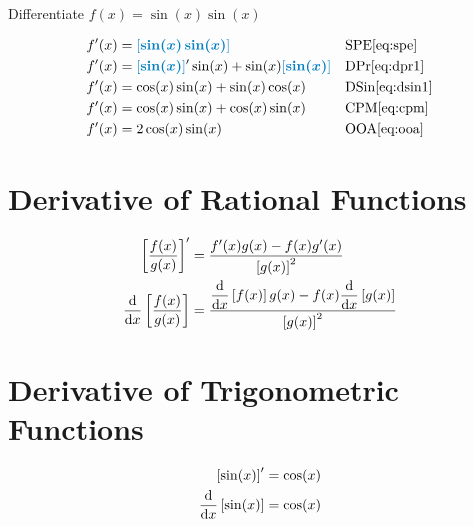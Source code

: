 \begin{example}[id:20141209-151354] \label{20141209-151354} \hfill \\

Differentiate $f(x)=\sin(x)\sin(x)$

\soln

\solnsteps
\begin{align*}
f'(x) &= \farg{\sin(x)\sin(x)} && \text{SPE} \eqref{eq:spe} \\
f'(x) &= \farg{\sin(x)}' \sin(x) + \sin (x) \farg{\sin(x)} && \text{DPr} \eqref{eq:dpr1} \\
f'(x) &= \cos(x) \sin(x) + \sin (x) \cos(x) && \text{DSin} \eqref{eq:dsin1} \\
f'(x) &= \cos(x)\sin(x) + \cos(x)\sin(x) && \text{CPM} \eqref{eq:cpm} \\
f'(x) &= 2\cos(x)\sin(x) && \text{OOA} \eqref{eq:ooa} %
\end{align*}
\end{example}

\section{Derivative of Rational Functions}


\begin{arule}
\begin{align}
	\left[ \dfrac{f(x)}{g(x)} \right]' &= \dfrac{f'(x)g(x)-f(x)g'(x)}{\left[g(x)\right]^2} \label{eq:drf1} \\
	\dfrac{\mathrm{d}}{\mathrm{d}x} \left[ \dfrac{f(x)}{g(x)} \right] & = \dfrac{\dfrac{\mathrm{d}}{\mathrm{d}x}\left[f(x)\right]g(x)-f(x) \dfrac{\mathrm{d}}{\mathrm{d}x} \left[g(x)\right] }{\left[g(x)\right]^2}  \label{eq:drf2}
\end{align}
\end{arule}

\section{Derivative of Trigonometric Functions}

\begin{arule}
\begin{align}
	\left[ \sin(x) \right]' &= \cos (x) \label{eq:dsin1} \\
	\dfrac{\mathrm{d}}{\mathrm{d}x} \left[ \sin(x) \right] & = \cos (x)  \label{eq:dsin2}
\end{align}
\end{arule}


